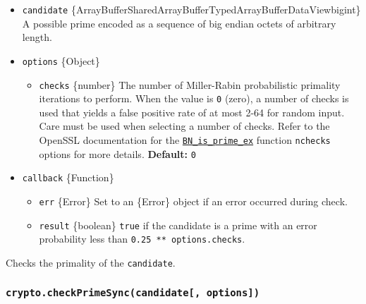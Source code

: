 \begin{itemize}
\tightlist
\item
  \texttt{candidate}
  \{ArrayBuffer\textbar SharedArrayBuffer\textbar TypedArray\textbar Buffer\textbar DataView\textbar bigint\}
  A possible prime encoded as a sequence of big endian octets of
  arbitrary length.
\item
  \texttt{options} \{Object\}

  \begin{itemize}
  \tightlist
  \item
    \texttt{checks} \{number\} The number of Miller-Rabin probabilistic
    primality iterations to perform. When the value is \texttt{0}
    (zero), a number of checks is used that yields a false positive rate
    of at most 2-64 for random input. Care must be used when selecting a
    number of checks. Refer to the OpenSSL documentation for the
    \href{https://www.openssl.org/docs/man1.1.1/man3/BN_is_prime_ex.html}{\texttt{BN\_is\_prime\_ex}}
    function \texttt{nchecks} options for more details.
    \textbf{Default:} \texttt{0}
  \end{itemize}
\item
  \texttt{callback} \{Function\}

  \begin{itemize}
  \tightlist
  \item
    \texttt{err} \{Error\} Set to an \{Error\} object if an error
    occurred during check.
  \item
    \texttt{result} \{boolean\} \texttt{true} if the candidate is a
    prime with an error probability less than
    \texttt{0.25\ **\ options.checks}.
  \end{itemize}
\end{itemize}

Checks the primality of the \texttt{candidate}.

\subsubsection{\texorpdfstring{\texttt{crypto.checkPrimeSync(candidate{[},\ options{]})}}{crypto.checkPrimeSync(candidate{[}, options{]})}}\label{crypto.checkprimesynccandidate-options}

